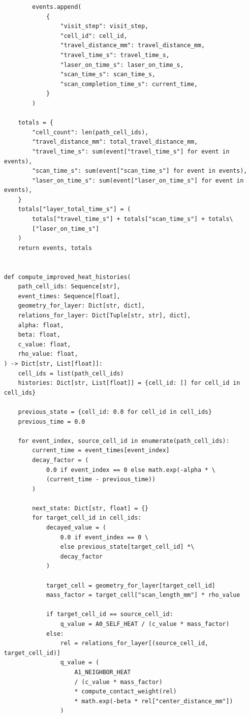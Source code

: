 \documentclass[a4paper, 12pt]{ctexart}
\begin{document}
\begin{verbatim}
        events.append(
            {
                "visit_step": visit_step,
                "cell_id": cell_id,
                "travel_distance_mm": travel_distance_mm,
                "travel_time_s": travel_time_s,
                "laser_on_time_s": laser_on_time_s,
                "scan_time_s": scan_time_s,
                "scan_completion_time_s": current_time,
            }
        )

    totals = {
        "cell_count": len(path_cell_ids),
        "travel_distance_mm": total_travel_distance_mm,
        "travel_time_s": sum(event["travel_time_s"] for event in events),
        "scan_time_s": sum(event["scan_time_s"] for event in events),
        "laser_on_time_s": sum(event["laser_on_time_s"] for event in events),
    }
    totals["layer_total_time_s"] = (
        totals["travel_time_s"] + totals["scan_time_s"] + totals\
        ["laser_on_time_s"]
    )
    return events, totals


def compute_improved_heat_histories(
    path_cell_ids: Sequence[str],
    event_times: Sequence[float],
    geometry_for_layer: Dict[str, dict],
    relations_for_layer: Dict[Tuple[str, str], dict],
    alpha: float,
    beta: float,
    c_value: float,
    rho_value: float,
) -> Dict[str, List[float]]:
    cell_ids = list(path_cell_ids)
    histories: Dict[str, List[float]] = {cell_id: [] for cell_id in cell_ids}

    previous_state = {cell_id: 0.0 for cell_id in cell_ids}
    previous_time = 0.0

    for event_index, source_cell_id in enumerate(path_cell_ids):
        current_time = event_times[event_index]
        decay_factor = (
            0.0 if event_index == 0 else math.exp(-alpha * \
            (current_time - previous_time))
        )

        next_state: Dict[str, float] = {}
        for target_cell_id in cell_ids:
            decayed_value = (
                0.0 if event_index == 0 \
                else previous_state[target_cell_id] *\
                decay_factor
            )

            target_cell = geometry_for_layer[target_cell_id]
            mass_factor = target_cell["scan_length_mm"] * rho_value

            if target_cell_id == source_cell_id:
                q_value = A0_SELF_HEAT / (c_value * mass_factor)
            else:
                rel = relations_for_layer[(source_cell_id, target_cell_id)]
                q_value = (
                    A1_NEIGHBOR_HEAT
                    / (c_value * mass_factor)
                    * compute_contact_weight(rel)
                    * math.exp(-beta * rel["center_distance_mm"])
                )


\end{verbatim}
\end{document}
